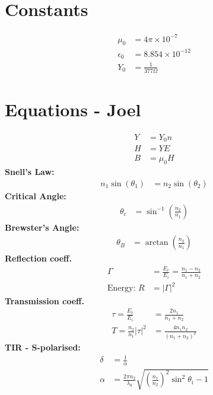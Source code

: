 \documentclass[landscape,a4paper]{article}
\begin{document}
\begin{multicols}{3}
	\section{Constants}
	\begin{align}
		\mu_0 &= 4\pi \times 10^{-7}\\
		\epsilon_0 &= 8.854 \times 10^{-12}\\
		Y_0 &= \frac{1}{377 \Omega}
	\end{align}
	
	\section{Equations - Joel}
	\begin{align}
		Y &= Y_0 n\\
		H &= YE\\
		B &= \mu_0 H
	\end{align}
	\textbf{Snell's Law: }
	\begin{align}
		n_1 \sin(\theta_1) &= n_2 \sin(\theta_2)
	\end{align}
	\textbf{Critical Angle:}
	\begin{align}
		\theta_c &= \sin^{-1}\left( \frac{n_2}{n_1} \right)
	\end{align}
	\textbf{Brewster's Angle:}
	\begin{align}
		\theta_B &=  \arctan \left( \frac{n_2}{n_1} \right)
	\end{align}
	\textbf{Reflection coeff.}
	\begin{align}
		\Gamma &= \frac{E_r}{E_i} = \frac{n_1 - n_2}{n_1 + n_2}\\
		\text{Energy: } R  &=  |\Gamma|^2
	\end{align}
	\textbf{Transmission coeff.}
	\begin{align}
		\tau = \frac{E_t}{E_i} &= \frac{2n_1}{n_1 + n_2}\\
		T = \frac{n_2}{n_1} |\tau|^2 &= \frac{4 n_1 n_2}{(n_1 + n_2)^2}
	\end{align}
	\textbf{TIR - S-polarised:}
	\begin{align}
		\delta &= \frac{1}{\alpha}\\
		\alpha &= \frac{2\pi n_2}{\lambda_0} \sqrt{\left( \frac{n_1}{n_2} \right)^2 \sin^2\theta_i - 1}\\

\end{align}
\end{multicols}
\end{document}
